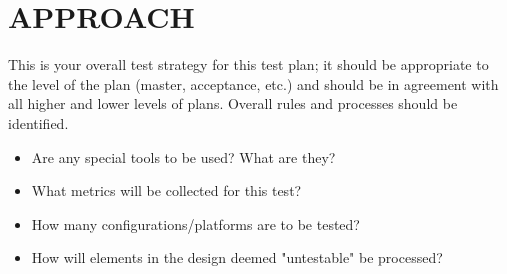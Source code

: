 \documentclass[twoside,letterpaper]{article}
\begin{document}
\section[APPROACH]{\bfseries\color{black} APPROACH}
{\itshape\color{black}

This is your overall test strategy for this test plan; it should be
appropriate to the level of the plan (master, acceptance, etc.) and
should be in agreement with all higher and lower levels of
plans. Overall rules and processes should be identified. 

\begin{itemize}
\item Are any special tools to be used? What are they?
\item What metrics will be collected for this test?
\item How many configurations/platforms are to be tested?
\item How will elements in the design deemed "untestable" be processed?
\end{itemize}
}
\end{document}

